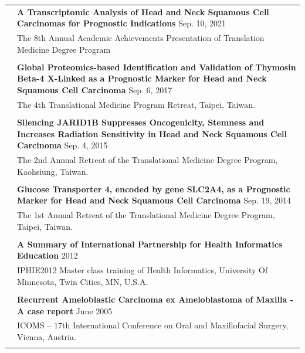 \documentclass[letterpaper, 11pt]{article}
\begin{document}
\begin{longtable}{p{1.3in}p{4.8in}}

{\color{OliveGreen}{Presentation}} 
& \textbf{A Transcriptomic Analysis of Head and Neck Squamous Cell Carcinomas for Prognostic Indications} \hfill Sep. 10, 2021 \\
& The 8th Annual Academic Achievements Presentation of Translation Medicine Degree Program \\
& \\

& \textbf{Global Proteomics-based Identification
and Validation of Thymosin Beta-4 X-Linked as a Prognostic Marker for Head
and Neck Squamous Cell Carcinoma} \hfill Sep. 6, 2017 \\
& The 4th Translational Medicine
Program Retreat, Taipei, Taiwan. \\
& \\

& \textbf{Silencing JARID1B Suppresses
Oncogenicity, Stemness and Increases Radiation Sensitivity in Head and
Neck Squamous Cell Carcinoma} \hfill Sep. 4, 2015 \\
& The 2nd Annual Retreat of the
Translational Medicine Degree Program, Kaohsiung, Taiwan. \\
& \\


& \textbf{Glucose Transporter 4, encoded by gene
SLC2A4, as a Prognostic Marker for Head and Neck Squamous Cell
Carcinoma} \hfill Sep. 19, 2014 \\
& The 1st Annual Retreat of the Translational Medicine Degree Program, Taipei, Taiwan. \\
& \\


& \textbf{A Summary of International Partnership for Health Informatics Education} \hfill  2012 \\
& IPHIE2012 Master
class training of Health Informatics, University Of Minnesota, Twin
Cities, MN, U.S.A. \\
& \\

& \textbf{Recurrent Ameloblastic Carcinoma ex
Ameloblastoma of Maxilla - A case report} \hfill June 2005 \\
& ICOMS – 17th International
Conference on Oral and Maxillofacial Surgery, Vienna, Austria. \\
& \\





\end{longtable}
\end{document}
